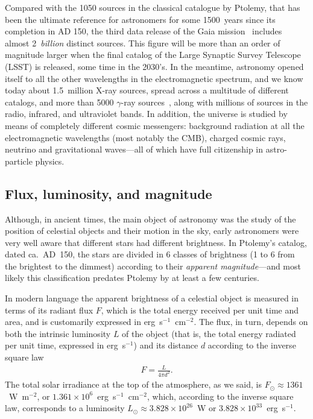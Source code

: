 Compared with the 1050 sources in the classical catalogue by Ptolemy, that has been
the ultimate reference for astronomers for some 1500~years since its completion in
AD 150, the third data release of the Gaia  mission~\cite{2023A&A...674A...1G}
includes almost 2~\emph{billion} distinct sources. This figure will be more than an
order of magnitude larger when the final catalog of the Large Synaptic Survey
Telescope (LSST) is released, some time in the 2030's. In the meantime, astronomy
opened itself to all the other wavelengths in the electromagnetic spectrum, and
we know today about 1.5~million X-ray sources, spread across a multitude of different
catalogs, and more than 5000 $\gamma$-ray sources~\cite{2020ApJS..247...33A}, along
with millions of sources in the radio, infrared, and ultraviolet bands. In addition,
the universe is studied by means of completely different cosmic messengers: background
radiation at all the electromagnetic wavelengths (most notably the CMB), charged
cosmic rays, neutrino and gravitational waves---all of which have full citizenship
in astro-particle physics.



\subsection{Flux, luminosity, and magnitude}
\label{sec:stars_magnitude}

Although, in ancient times, the main object of astronomy was the study of the position
of celestial objects and their motion in the sky, early astronomers were very well
aware that different stars had different brightness. In Ptolemy's catalog, dated
ca.~AD~150, the stars are divided in 6 classes of brightness (1 to 6 from the
brightest to the dimmest) according to their \emph{apparent magnitude}---and
most likely this classification predates Ptolemy by at least a few centuries.

In modern language the apparent brightness of a celestial object is measured in
terms of its radiant flux $F$, which is the total energy received per unit time
and area, and is customarily expressed in erg~s$^{-1}$~cm$^{-2}$. The flux, in turn,
depends on both the intrinsic luminosity $L$ of the object (that is, the total energy
radiated per unit time, expressed in erg~s$^{-1}$) and its distance $d$ according
to the inverse square law
\begin{align}
  F = \frac{L}{4\pi d^2}.
\end{align}
The total solar irradiance at the top of the atmosphere, as we said, is
$F_\odot \approx 1361$~W~m$^{-2}$, or $1.361 \times 10^6$~erg~s$^{-1}$~cm$^{-2}$,
which, according to the inverse square law, corresponds to a luminosity
$L_\odot \approx 3.828 \times 10^{26}$~W or $3.828 \times 10^{33}$~erg~s$^{-1}$.

